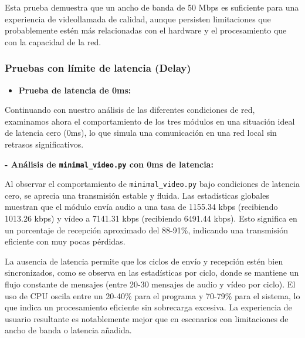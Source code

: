 Esta prueba demuestra que un ancho de banda de 50 Mbps es suficiente para una experiencia de videollamada de calidad, aunque persisten limitaciones que probablemente estén más relacionadas con el hardware y el procesamiento que con la capacidad de la red.

\newpage

\subsubsection{Pruebas con límite de latencia (Delay)}

\begin{itemize}
  \item \textbf{Prueba de latencia de 0ms:}
\end{itemize}

Continuando con nuestro análisis de las diferentes condiciones de red, examinamos ahora el comportamiento de los tres módulos en una situación ideal de latencia cero (0ms), lo que simula una comunicación en una red local sin retrasos significativos.

\vspace{\baselineskip}

\textbf{- Análisis de \texttt{minimal\_video.py} con 0ms de latencia:}
\vspace{\baselineskip}

Al observar el comportamiento de \texttt{minimal\_video.py} bajo condiciones de latencia cero, se aprecia una transmisión estable y fluida. Las estadísticas globales muestran que el módulo envía audio a una tasa de 1155.34 kbps (recibiendo 1013.26 kbps) y vídeo a 7141.31 kbps (recibiendo 6491.44 kbps). Esto significa en un porcentaje de recepción aproximado del 88-91\%, indicando una transmisión eficiente con muy pocas pérdidas.
\vspace{\baselineskip}

La ausencia de latencia permite que los ciclos de envío y recepción estén bien sincronizados, como se observa en las estadísticas por ciclo, donde se mantiene un flujo constante de mensajes (entre 20-30 mensajes de audio y vídeo por ciclo). El uso de CPU oscila entre un 20-40\% para el programa y 70-79\% para el sistema, lo que indica un procesamiento eficiente sin sobrecarga excesiva. La experiencia de usuario resultante es notablemente mejor que en escenarios con limitaciones de ancho de banda o latencia añadida.

\vspace{\baselineskip}

